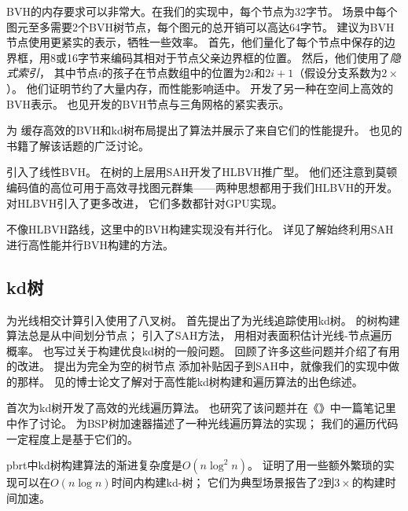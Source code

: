 BVH的内存要求可以非常大。在我们的实现中，每个节点为32字节。
场景中每个图元至多需要2个BVH树节点，每个图元的总开销可以高达64字节。
\citet{10.5555/2383894.2383909}建议为BVH节点使用更紧实的表示，牺牲一些效率。
首先，他们量化了每个节点中保存的边界框，用8或16字节来编码其相对于节点父亲边界框的位置。
然后，他们使用了{\itshape 隐式索引}，
其中节点$i$的孩子在节点数组中的位置为$2i$和$2i+1$（假设分支系数为$2\times$）。
他们证明节约了大量内存，而性能影响适中。
\citet{10.2312:PE:VMV:VMV10:227-234}开发了另一种在空间上高效的BVH表示。
也见\citet{10.5555/1839214.1839242}开发的BVH节点与三角网格的紧实表示。

\citet{10.1111/j.1467-8659.2006.00970.x}为
缓存高效的BVH和kd树布局提出了算法并展示了来自它们的性能提升。
也见\citet{10.5555/1121584}的书籍了解该话题的广泛讨论。

\citet{10.1111/j.1467-8659.2009.01377.x}引入了线性BVH。
\citet{10.5555/1921479.1921493}在树的上层用SAH开发了HLBVH推广型。
他们还注意到莫顿编码值的高位可用于高效寻找图元群集——两种思想都用于我们HLBVH的开发。
\citet{10.1145/2018323.2018333}对HLBVH引入了更多改进，
它们多数都针对GPU实现。

不像HLBVH路线，这里中的BVH构建实现没有并行化。
详见\citet{5669303}了解始终利用SAH进行高性能并行BVH构建的方法。

\subsection{kd树}\label{sub:kd树}
\citet{6429331}为光线相交计算引入使用了八叉树。
\citet{kaplan1985use}首先提出了为光线追踪使用kd树。
\citeauthor{kaplan1985use}的树构建算法总是从中间划分节点；
\citet{MacDonald1990}引入了SAH方法，
用相对表面积估计光线-节点遍历概率。
\citet{Naylor1993:27}也写过关于构建优良kd树的一般问题。
\citet{HavranImproving2002}回顾了许多这些问题并介绍了有用的改进。
\citet{hurley2002fast}提出为完全为空的树节点
添加补贴因子到SAH中，就像我们的实现中做的那样。
见\citet{Havran2000:PhD}的博士论文了解对于高性能kd树构建和遍历算法的出色综述。


\citet{10.1007/978-3-642-71071-1_4}首次为kd树开发了高效的光线遍历算法。
\citet{ArvoRay1988}也研究了该问题并在《{\itshape{}}》中一篇笔记里中作了讨论。
\citet{SUNG1992271}为BSP树加速器描述了一种光线遍历算法的实现；
我们的遍历代码一定程度上是基于它们的。

pbrt中kd树构建算法的渐进复杂度是$O(n\log^2n)$。
\citet{4061547}证明了用一些额外繁琐的实现可以在$O(n\log n)$时间内构建kd-树；
它们为典型场景报告了$2$到$3\times$的构建时间加速。

